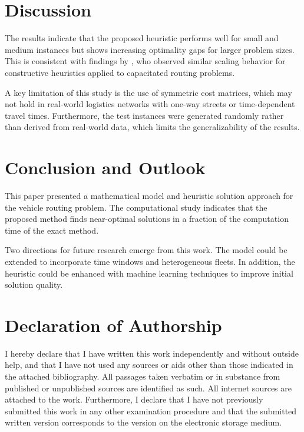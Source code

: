 \documentclass[11pt,a4paper]{article}
\begin{document}
\section{Discussion}
\label{sec:discussion}
The results indicate that the proposed heuristic performs well for small and medium instances but shows increasing optimality gaps for larger problem sizes. This is consistent with findings by \textcite{toth2014vehicle}, who observed similar scaling behavior for constructive heuristics applied to capacitated routing problems.

A key limitation of this study is the use of symmetric cost matrices, which may not hold in real-world logistics networks with one-way streets or time-dependent travel times. Furthermore, the test instances were generated randomly rather than derived from real-world data, which limits the generalizability of the results.

\section{Conclusion and Outlook}
\label{sec:conclusion}
This paper presented a mathematical model and heuristic solution approach for the vehicle routing problem. The computational study indicates that the proposed method finds near-optimal solutions in a fraction of the computation time of the exact method.

Two directions for future research emerge from this work. The model could be extended to incorporate time windows and heterogeneous fleets. In addition, the heuristic could be enhanced with machine learning techniques to improve initial solution quality.

\newpage
{}
\setcounter{page}{6} %
\printbibliography

\newpage
{}
\section*{Declaration of Authorship}
I hereby declare that I have written this work independently and without outside help, and that I have not used any sources or aids other than those indicated in the attached bibliography. All passages taken verbatim or in substance from published or unpublished sources are identified as such. All internet sources are attached to the work. Furthermore, I declare that I have not previously submitted this work in any other examination procedure and that the submitted written version corresponds to the version on the electronic storage medium.
\end{document}
